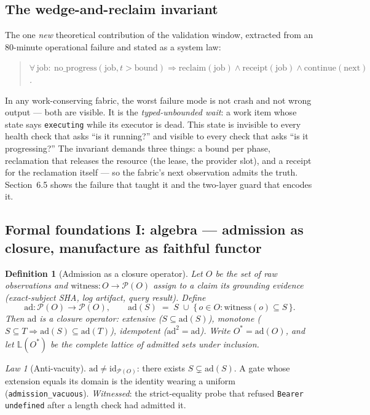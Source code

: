 \documentclass[11pt,a4paper]{article}
\newtheorem{definition}{Definition}
\theoremstyle{remark}
\newtheorem{law}{Law}
\newcommand{\term}[1]{\texttt{#1}}
\begin{document}
\subsection{The wedge-and-reclaim invariant}
The one \emph{new} theoretical contribution of the validation window, extracted from an 80-minute operational failure and stated as a system law:
\begin{quote}\itshape
$\forall\,\mathrm{job}:\ \mathrm{no\_progress}(\mathrm{job}, t > \mathrm{bound}) \Rightarrow \mathrm{reclaim}(\mathrm{job}) \wedge \mathrm{receipt}(\mathrm{job}) \wedge \mathrm{continue}(\mathrm{next})$.
\end{quote}
In any work-conserving fabric, the worst failure mode is not crash and not wrong output --- both are visible. It is the \emph{typed-unbounded wait}: a work item whose state says \term{executing} while its executor is dead. This state is invisible to every health check that asks ``is it running?'' and visible to every check that asks ``is it progressing?'' The invariant demands three things: a bound per phase, reclamation that releases the resource (the lease, the provider slot), and a receipt for the reclamation itself --- so the fabric's next observation admits the truth. Section~6.5 shows the failure that taught it and the two-layer guard that encodes it.

\subsection{Formal foundations I: algebra --- admission as closure, manufacture as faithful functor}
\begin{definition}[Admission as a closure operator]\label{def:closure}
Let $O$ be the set of raw observations and $\mathrm{witness}\colon O \to \mathcal{P}(O)$ assign to a claim its grounding evidence (exact-subject SHA, log artifact, query result). Define
\[
\mathrm{ad}\colon \mathcal{P}(O) \to \mathcal{P}(O), \qquad
\mathrm{ad}(S) \;=\; S \;\cup\; \{\, o \in O : \mathrm{witness}(o) \subseteq S \,\}.
\]
Then $\mathrm{ad}$ is a closure operator: extensive ($S \subseteq \mathrm{ad}(S)$), monotone ($S \subseteq T \Rightarrow \mathrm{ad}(S) \subseteq \mathrm{ad}(T)$), idempotent ($\mathrm{ad}^2 = \mathrm{ad}$). Write $O^{*} = \mathrm{ad}(O)$, and let $\mathbb{L}(O^{*})$ be the complete lattice of admitted sets under inclusion.
\end{definition}
\begin{law}[Anti-vacuity]\label{law:antivac}
$\mathrm{ad} \neq \mathrm{id}_{\mathcal{P}(O)}$: there exists $S \subsetneq \mathrm{ad}(S)$. A gate whose extension equals its domain is the identity wearing a uniform (\term{admission\_vacuous}). \emph{Witnessed}: the strict-equality probe that refused \term{Bearer undefined} after a length check had admitted it.
\end{law}
\end{document}
